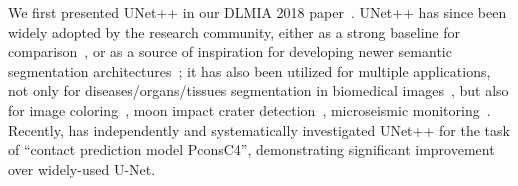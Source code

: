 We first presented UNet++ in our DLMIA 2018 paper~\citep{zhou2018unet++}. 
UNet++ has since been widely adopted by the research community, either as a strong baseline for comparison~\citep{sun2019high,fang2019selective,fang2019improved,meng2020multiscale}, or as a source of inspiration for developing newer semantic segmentation architectures~\citep{zhang2018mdu,chen2018improved,zhou2018learning,wu2019automatical,song2019u,yang2019eda}; it has also been utilized for multiple applications, not only for diseases/organs/tissues segmentation in biomedical images~\citep{zyuzin2019comparison,cui2019pulmonary}, but also for image coloring~\citep{di2021color}, moon impact crater detection~\citep{jia2021moon}, microseismic monitoring~\citep{guo2021first}. Recently, \citet{shenoy2019feature} has independently and systematically investigated UNet++ for the task of ``contact prediction model PconsC4'', demonstrating significant improvement over widely-used U-Net. 




